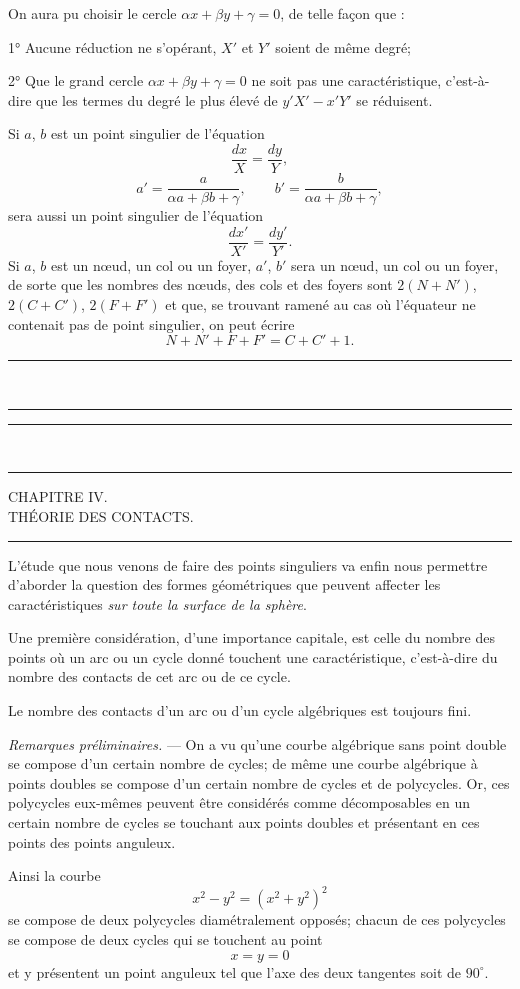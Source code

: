 \documentclass[11pt]{article}
\newcommand{\ornament}{\begin{center}\rule{2.5em}{0.4pt}\,\raisebox{0.1ex}{\tiny$\bullet\bullet\bullet$}\,\rule{2.5em}{0.4pt}\end{center}}
\newcommand{\shortline}{\begin{center}\rule{3.5em}{0.4pt}\end{center}}
\begin{document}
On aura pu choisir le cercle $\alpha x+\beta y+\gamma=0$, de telle façon que :

1° Aucune réduction ne s’opérant, $X'$ et $Y'$ soient de même degré;

2° Que le grand cercle $\alpha x+\beta y+\gamma=0$ ne soit pas une caractéristique, c’est-à-dire que les termes du degré le plus élevé de $y'X'-x'Y'$ se réduisent.

Si $a$, $b$ est un point singulier de l’équation
\[
\frac{dx}{X}=\frac{dy}{Y},
\]
\[
a'=\frac{a}{\alpha a+\beta b+\gamma},
\qquad
b'=\frac{b}{\alpha a+\beta b+\gamma},
\]
sera aussi un point singulier de l’équation
\[
\frac{dx'}{X'}=\frac{dy'}{Y'}.
\]
Si $a$, $b$ est un nœud, un col ou un foyer, $a'$, $b'$ sera un nœud, un col ou un foyer, de sorte que les nombres des nœuds, des cols et des foyers sont $2(N+N')$, $2(C+C')$, $2(F+F')$ et que, se trouvant ramené au cas où l’équateur ne contenait pas de point singulier, on peut écrire
\[
N+N'+F+F'=C+C'+1.
\]

\ornament



\ornament
\begin{center}
{\Large CHAPITRE IV.}\\[0.4em]
{\small THÉORIE DES CONTACTS.}
\end{center}
\shortline

L’étude que nous venons de faire des points singuliers va enfin nous permettre d’aborder la question des formes géométriques que peuvent affecter les caractéristiques \emph{sur toute la surface de la sphère}.

Une première considération, d’une importance capitale, est celle du nombre des points où un arc ou un cycle donné touchent une caractéristique, c’est-à-dire du nombre des contacts de cet arc ou de ce cycle.

Le nombre des contacts d’un arc ou d’un cycle algébriques est toujours fini.

\emph{Remarques préliminaires.} --- On a vu qu’une courbe algébrique sans point double se compose d’un certain nombre de cycles; de même une courbe algébrique à points doubles se compose d’un certain nombre de cycles et de polycycles. Or, ces polycycles eux-mêmes peuvent être considérés comme décomposables en un certain nombre de cycles se touchant aux points doubles et présentant en ces points des points anguleux.

Ainsi la courbe
\[
x^2-y^2=(x^2+y^2)^2
\]
se compose de deux polycycles diamétralement opposés; chacun de ces polycycles se compose de deux cycles qui se touchent au point
\[
x=y=0
\]
et y présentent un point anguleux tel que l’axe des deux tangentes soit de $90^\circ$.
\end{document}
